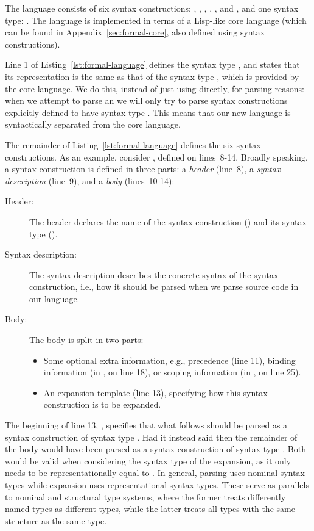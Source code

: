\documentclass{kththesis}
\begin{document}
The language consists of six syntax constructions: , , , , , and , and one syntax type: . The language is implemented in terms of a Lisp-like core language (which can be found in Appendix~\ref{sec:formal-core}, also defined using syntax constructions).

Line 1 of Listing~\ref{lst:formal-language} defines the syntax type , and states that its representation is the same as that of the syntax type , which is provided by the core language. We do this, instead of just using  directly, for parsing reasons: when we attempt to parse an  we will only try to parse syntax constructions explicitly defined to have syntax type . This means that our new language is syntactically separated from the core language.

The remainder of Listing~\ref{lst:formal-language} defines the six syntax constructions. As an example, consider , defined on lines~8-14. Broadly speaking, a syntax construction is defined in three parts: a \emph{header} (line~8), a \emph{syntax description} (line~9), and a \emph{body} (lines~10-14):

\begin{description}
  \item[Header:] The header declares the name of the syntax construction () and its syntax type ().
  \item[Syntax description:] The syntax description describes the concrete syntax of the syntax construction, i.e., how it should be parsed when we parse source code in our language.
  \item[Body:] The body is split in two parts:
  \begin{itemize}
    \item Some optional extra information, e.g., precedence (line 11), binding information (in , on line 18), or scoping information (in , on line 25).
    \item An expansion template (line 13), specifying how this syntax construction is to be expanded.
  \end{itemize}
\end{description}

The beginning of line 13, , specifies that what follows should be parsed as a syntax construction of syntax type . Had it instead said  then the remainder of the body would have been parsed as a syntax construction of syntax type . Both would be valid when considering the syntax type of the expansion, as it only needs to be representationally equal to . In general, parsing uses nominal syntax types while expansion uses representational syntax types. These serve as parallels to nominal and structural type systems, where the former treats differently named types as different types, while the latter treats all types with the same structure as the same type.
\end{document}
